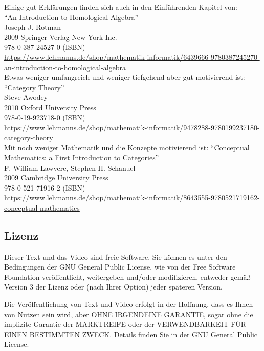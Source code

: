\documentclass[a4paper]{amsart}
\theoremstyle{definition}
\begin{document}
Einige gut Erklärungen finden sich auch in den Einführenden Kapitel von:\\
"`An Introduction to Homological Algebra"'\\
Joseph J. Rotman\\
2009 Springer-Verlag New York Inc.\\
978-0-387-24527-0 (ISBN)\\
{\tiny \url{https://www.lehmanns.de/shop/mathematik-informatik/6439666-9780387245270-an-introduction-to-homological-algebra}}\\

Etwas weniger umfangreich und weniger tiefgehend aber gut motivierend ist:
"`Category Theory"'\\
Steve Awodey\\
2010 Oxford University Press\\
978-0-19-923718-0 (ISBN)\\
{\tiny\url{https://www.lehmanns.de/shop/mathematik-informatik/9478288-9780199237180-category-theory}}\\

Mit noch weniger Mathematik und die Konzepte motivierend ist:
"`Conceptual Mathematics: a First Introduction to Categories"'\\
F. William Lawvere, Stephen H. Schanuel\\
2009 Cambridge University Press\\
978-0-521-71916-2 (ISBN)\\
{\tiny\url{https://www.lehmanns.de/shop/mathematik-informatik/8643555-9780521719162-conceptual-mathematics}}

\subsection*{Lizenz}
Dieser Text und das Video sind freie Software. Sie können es unter den Bedingungen der
GNU General Public License, wie von der Free Software Foundation veröffentlicht, weitergeben
und/oder modifizieren, entweder gemäß Version 3 der Lizenz oder (nach Ihrer Option) jeder späteren Version.

Die Veröffentlichung von Text und Video erfolgt in der Hoffnung, dass es Ihnen von Nutzen sein wird,
aber OHNE IRGENDEINE GARANTIE, sogar ohne die implizite Garantie der MARKTREIFE oder der
VERWENDBARKEIT FÜR EINEN BESTIMMTEN ZWECK. Details finden Sie in der GNU General Public License.
\end{document}

